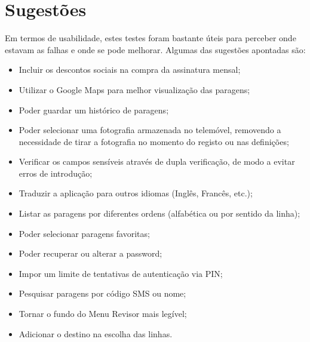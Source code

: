 \section{Sugestões}

Em termos de usabilidade, estes testes foram bastante úteis para perceber onde estavam as falhas e onde se pode melhorar. Algumas das sugestões apontadas são:
\begin{itemize}
\item Incluir os descontos sociais na compra da assinatura mensal;
\item Utilizar o Google Maps para melhor visualização das paragens;
\item Poder guardar um histórico de paragens;
\item Poder selecionar uma fotografia armazenada no telemóvel, removendo a necessidade de tirar a fotografia no momento do registo ou nas definições;
\item Verificar os campos sensíveis através de dupla verificação, de modo a evitar erros de introdução;
\item Traduzir a aplicação para outros idiomas (Inglês, Francês, etc.);
\item Listar as paragens por diferentes ordens (alfabética ou por sentido da linha);
\item Poder selecionar paragens favoritas;
\item Poder recuperar ou alterar a password;
\item Impor um limite de tentativas de autenticação via PIN;
\item Pesquisar paragens por código SMS ou nome;
\item Tornar o fundo do Menu Revisor mais legível;
\item Adicionar o destino na escolha das linhas.
\end{itemize}